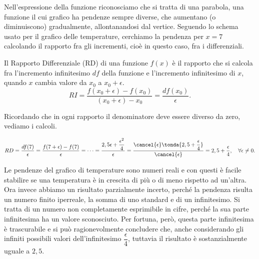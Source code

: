 Nell'espressione della funzione riconosciamo che si tratta di una parabola, 
una funzione il cui grafico ha pendenze sempre diverse, che aumentano (o 
diminuiscono) gradualmente, allontanandosi dal vertice. Seguendo lo schema 
usato per il grafico delle temperature, cerchiamo la pendenza per \(x=7\) 
calcolando il rapporto fra gli incrementi, cioè in questo caso, fra i 
differenziali.
\begin{definizione}
Il Rapporto Differenziale (RD) di una funzione \(f(x)\) è il 
rapporto che si calcola fra l'incremento infinitesimo \(df\) della funzione 
e l'incremento infinitesimo di \(x\), quando \(x\) cambia valore da \(x_0\) a 
\(x_0+\epsilon\).
\[
 RI= \frac{f(x_0+\epsilon)-f(x_0)}{(x_0+\epsilon)- 
x_0}=\frac{df(x_0)}{\epsilon}.
\]
\end{definizione}
Ricordando che in ogni rapporto il denominatore deve essere diverso 
da zero, vediamo i calcoli.

\[
 RD=\frac{df(7)}{\epsilon}=\frac{f(7+\epsilon) - f(7)}{\epsilon}=\dots=
 \frac{2,5 \epsilon + \dfrac{\epsilon^2}{4}}{\epsilon}=
 \frac{\cancel{\epsilon}\tonda{2,5 + \dfrac{\epsilon}{4}}}{\cancel{\epsilon}}=
 2,5 + \frac{\epsilon}{4}, \quad \forall \epsilon\ne 0. 
\]

Le pendenze del grafico di temperature sono numeri reali e  con questi è facile 
stabilire se una temperatura è in crescita di più o di meno rispetto ad 
un'altra. Ora invece abbiamo un risultato parzialmente incerto, perché la 
pendenza risulta un numero finito iperreale, la somma di uno standard e di 
un infinitesimo. Si tratta di un numero non completamente esprimibile in 
cifre, perché la sua parte infinitesima ha un valore sconosciuto.
Per fortuna, però, questa parte infinitesima è trascurabile e si può 
ragionevolmente concludere che, anche considerando gli infiniti possibili 
valori dell'infinitesimo \(\dfrac{\epsilon}{4}\), tuttavia il risultato è 
sostanzialmente uguale a \(2,5\).

